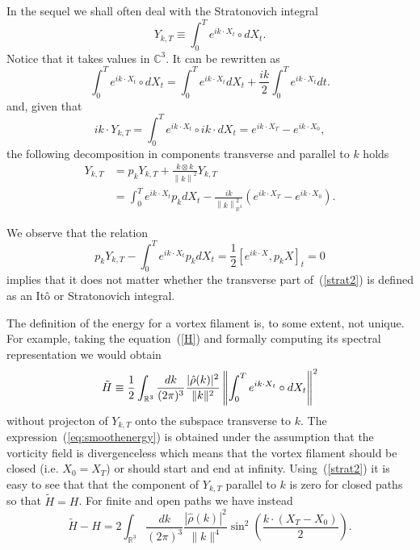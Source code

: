 In the sequel we shall often deal with the Stratonovich integral 
$$
Y_{k,T} \equiv \int_{0}^{T}e^{ik\cdot X_{t}}\circ dX_{t}.
$$ 
Notice that it takes values in $%
\mathbb{C}^{3}$. It can be rewritten as 
\begin{equation}
\int_{0}^{T}e^{ik\cdot X_{t}}\circ dX_{t}=\int_{0}^{T}e^{ik\cdot
X_{t}}dX_{t}+\frac{ik}{2}\int_{0}^{T}e^{ik\cdot X_{t}}dt.  \label{strat1}
\end{equation}
and, given that
$$
ik\cdot Y_{k,T} = \int_0^T  e^{ik\cdot X_t} \circ ik \cdot dX_t =
e^{i k\cdot X_T} - e^{i k\cdot X_0}, 
$$
the following decomposition in components transverse and parallel
to $k$  holds
\begin{equation}
\begin{split}
Y_{k,T} & = p_k Y_{k,T} + \frac{k\otimes k}{\left\| k\right\|^2} Y_{k,T}
\\ & 
=\int_{0}^{T}e^{ik\cdot
X_{t}}p_{k}dX_{t}-\frac{ik}{\left\| k\right\| _{\mathbb{R}^{3}}^{2}}\left(
e^{ik\cdot X_{T}}-e^{ik\cdot X_{0}}\right).   \label{strat2}
\end{split}
\end{equation}


We observe that the relation
$$
p_k Y_{k,T} -  \int_{0}^{T}e^{ik\cdot
X_{t}}p_{k}dX_{t} = \frac{1}{2} [e^{ik\cdot X}, p_k X]_t = 0
$$
implies that it does not matter whether the
transverse part of~(\ref{strat2}) is defined as an It\^o or
Stratonovich integral. 

The definition of the energy for a vortex filament is, to some extent, not
unique. For example, taking the equation~(\ref{H}) and formally
computing its spectral representation we would obtain 
\begin{equation}
\tilde{H} \equiv \frac{1}{2} \int_{\mathbb{R}^3} \frac{dk}{(2\pi)^3} \frac{|\hat{\rho}(k)|^2}{\|k\|^2} 
\left\| \int_0^T e^{i k \cdot X_t} \circ dX_t \right\|^2
\end{equation}
without projecton of $Y_{k,T}$ onto the subspace transverse to $k$. 
The expression~(\ref{eq:smoothenergy}) is obtained under the assumption that the
vorticity field is divergenceless which means that the vortex filament
should be closed (i.e. $X_0 = X_T$) or should start and end at
infinity. Using~(\ref{strat2}) it is easy to see that that the
component of $Y_{k,T}$ parallel to $k$ is zero for closed paths so
that $\tilde{H} = H$. 
For finite and open paths we have instead
\begin{equation}
\tilde{H} - H = 2 \int_{\mathbb{R}^3}  \frac{dk}{(2\pi)^3} \frac{|\hat{\rho}(k)|^2}{\|k\|^4}
\sin^2\left(\frac{k \cdot (X_T-X_0)}{2}\right).
\label{eq:difference}
\end{equation}

